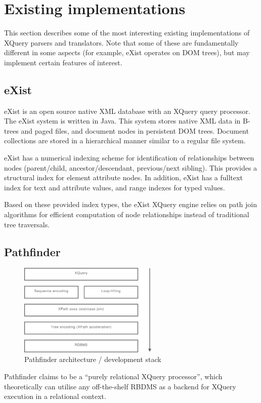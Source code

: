 \section{Existing implementations}
\label{sect:existing_implementations}

This section describes some of the most interesting existing implementations of
XQuery parsers and translators. Note that some of these are fundamentally
different in some aspects (for example, eXist operates on DOM trees), but may
implement certain features of interest.

\subsection{eXist}
eXist\cite{exist_doc} is an open source native XML database with an XQuery
query processor. The eXist system is written in Java. This system stores native
XML data in B-trees and paged files, and document nodes
in persistent DOM trees\cite{exist_factsheet}. Document collections are stored
in a hierarchical manner similar to a regular file system.

eXist has a numerical indexing scheme for identification of relationships
between nodes (parent/child, ancestor/descendant, previous/next sibling). This
provides a structural index for element attribute nodes. In addition, eXist has
a fulltext index for text and attribute values, and range indexes for typed
values.

Based on these provided index types, the eXist XQuery engine relies on path
join algorithms\cite{exist_idx_drv_query} for efficient computation of node
relationships instead of traditional tree traversals. 

\subsection{Pathfinder}
\label{sect:theory:pathfinder}
\begin{figure}[h]
  \centering
    \includegraphics[width=0.6\textwidth]{diagrams/pathfinder_arch}
  \caption{Pathfinder architecture / development stack}
\end{figure}
Pathfinder\cite{pathfinderHome} claims to be a ``purely relational XQuery
processor'', which theoretically can utilise any off-the-shelf RBDMS as a
backend for XQuery execution in a relational context.

